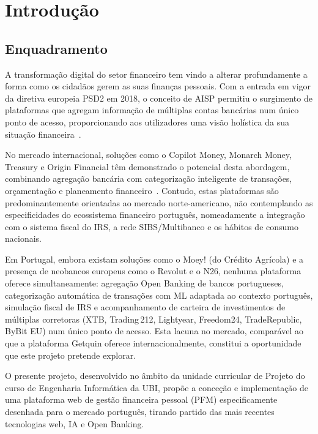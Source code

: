 \chapter{Introdução}
\label{chap:intro}

\section{Enquadramento}
\label{sec:enquadramento}

A transformação digital do setor financeiro tem vindo a alterar profundamente a forma como os cidadãos gerem as suas finanças pessoais. Com a entrada em vigor da diretiva europeia \ac{PSD2} em 2018, o conceito de \ac{AISP} permitiu o surgimento de plataformas que agregam informação de múltiplas contas bancárias num único ponto de acesso, proporcionando aos utilizadores uma visão holística da sua situação financeira~\cite{psd2directive}.

No mercado internacional, soluções como o Copilot Money, Monarch Money, Treasury e Origin Financial têm demonstrado o potencial desta abordagem, combinando agregação bancária com categorização inteligente de transações, orçamentação e planeamento financeiro~\cite{copilot2024,monarch2024}. Contudo, estas plataformas são predominantemente orientadas ao mercado norte-americano, não contemplando as especificidades do ecossistema financeiro português, nomeadamente a integração com o sistema fiscal do \ac{IRS}, a rede \ac{SIBS}/Multibanco e os hábitos de consumo nacionais.

Em Portugal, embora existam soluções como o Moey! (do Crédito Agrícola) e a presença de neobancos europeus como o Revolut e o N26, nenhuma plataforma oferece simultaneamente: agregação Open Banking de bancos portugueses, categorização automática de transações com \ac{ML} adaptada ao contexto português, simulação fiscal de \ac{IRS} e acompanhamento de carteira de investimentos de múltiplas corretoras (XTB, Trading\,212, Lightyear, Freedom24, TradeRepublic, ByBit EU) num único ponto de acesso. Esta lacuna no mercado, comparável ao que a plataforma Getquin oferece internacionalmente, constitui a oportunidade que este projeto pretende explorar.

O presente projeto, desenvolvido no âmbito da unidade curricular de Projeto do curso de Engenharia Informática da \ac{UBI}, propõe a conceção e implementação de uma plataforma web de gestão financeira pessoal (\ac{PFM}) especificamente desenhada para o mercado português, tirando partido das mais recentes tecnologias web, \ac{IA} e Open Banking.


